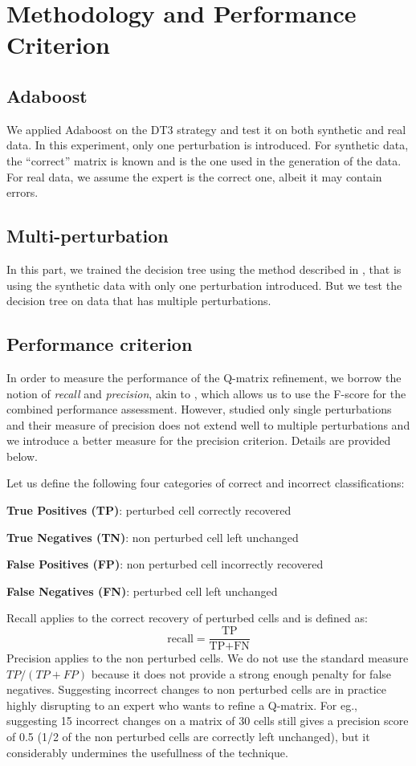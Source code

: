 \documentclass{edm_template}
\begin{document}
\section{Methodology and Performance Criterion}
\subsection{Adaboost}
We applied Adaboost on the DT3 strategy and test it on both synthetic and real data. In this experiment, only one perturbation is introduced.  For synthetic data, the ``correct'' matrix is known and is the one used in the generation of the data.  For real data, we assume the expert is the correct one, albeit it may contain errors.
\subsection{Multi-perturbation}
In this part, we trained the decision tree using the method described in , that is using the synthetic data with only one perturbation introduced. But we test the decision tree on data that has multiple perturbations.
\subsection{Performance criterion}
In order to measure the performance of the Q-matrix refinement, we borrow the notion of \textit{recall} and \textit{precision}, akin to , which allows us to use the F-score for the combined performance assessment. However,  studied only single perturbations and their measure of precision does not extend well to multiple perturbations and we introduce a better measure for the precision criterion.  Details are provided below.

Let us define the following four categories of correct and incorrect classifications:
\begin{compactitem}
\item \textbf{True Positives (TP)}: perturbed cell correctly recovered
\item \textbf{True Negatives (TN)}: non perturbed cell left unchanged
\item \textbf{False Positives (FP)}: non perturbed cell incorrectly recovered
\item \textbf{False Negatives (FN)}: perturbed cell left unchanged
\end{compactitem}
Recall applies to the correct recovery of perturbed cells and is defined as:
 $$ \mathrm{recall}=\frac{\textrm{TP}}{\textrm{TP}+\textrm{FN}}$$
Precision applies to the non perturbed cells.  We do not use the standard measure $TP / (TP + FP)$ because it does not provide a strong enough penalty for false negatives. Suggesting incorrect changes to non perturbed cells are in practice highly disrupting to an expert who wants to refine a Q-matrix.  For eg., suggesting 15 incorrect changes on a matrix of 30 cells still gives a precision score of 0.5 (1/2 of the non perturbed cells are correctly left unchanged), but it considerably undermines the usefullness of the technique.
\end{document}
